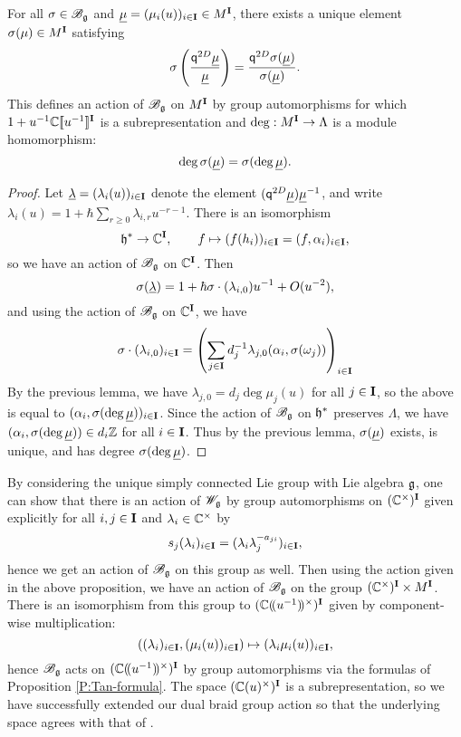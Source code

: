 \begin{proposition}\label{P:Bg-action-M}
    For all $\sigma\in\mathscr{B}_{\mathfrak{g}}$ and $\underline{\mu} = (\mu_i(u))_{i\in\mathbf{I}} \in M^{\mathbf{I}}$, there exists a unique element $\sigma(\mu)\in M^{\mathbf{I}}$ satisfying
    \[\sigma\left(\frac{\mathsf{q}^{2D}\underline{\mu}}{\underline{\mu}}\right) = \frac{\mathsf{q}^{2D}\sigma(\underline{\mu})}{\sigma(\underline{\mu})}.\]
    This defines an action of $\mathscr{B}_{\mathfrak{g}}$ on $M^{\mathbf{I}}$ by group automorphisms for which $1+u^{-1}\mathbb{C}[\![u^{-1}]\!]^{\mathbf{I}}$ is a subrepresentation and $\deg:M^{\mathbf{I}}\to\Lambda$ is a module homomorphism:
    \[\deg\sigma(\underline{\mu}) = \sigma(\deg\underline{\mu}).\]
\end{proposition}
\begin{proof}
    Let $\underline{\lambda} = (\lambda_i(u))_{i\in\mathbf{I}}$ denote the element $(\mathsf{q}^{2D}\underline{\mu})\underline{\mu}^{-1}$, and write $\lambda_i(u) = 1+\hbar\sum_{r\geq 0}\lambda_{i,r}u^{-r-1}$.
    There is an isomorphism
    \[\mathfrak{h}^*\to\mathbb{C}^{\mathbf{I}}, \qquad f\mapsto (f(h_i))_{i\in\mathbf{I}} = (f, \alpha_i)_{i\in\mathbf{I}},\]
    so we have an action of $\mathscr{B}_{\mathfrak{g}}$ on $\mathbb{C}^{\mathbf{I}}$.
    Then
    \[\sigma(\underline{\lambda}) = 1 + \hbar\sigma\cdot(\lambda_{i,0})u^{-1} + O(u^{-2}),\]
    and using the action of $\mathscr{B}_{\mathfrak{g}}$ on $\mathbb{C}^{\mathbf{I}}$, we have
    \[\sigma\cdot(\lambda_{i,0})_{i\in\mathbf{I}} = \left(\sum_{j\in\mathbf{I}}d_j^{-1}\lambda_{j,0}(\alpha_i,\sigma(\omega_j))\right)_{i\in\mathbf{I}}\]
    By the previous lemma, we have $\lambda_{j,0} = d_j\deg\mu_j(u)$ for all $j\in\mathbf{I}$, so the above is equal to $(\alpha_i,\sigma(\deg\underline{\mu}))_{i\in\mathbf{I}}$.
    Since the action of $\mathscr{B}_{\mathfrak{g}}$ on $\mathfrak{h}^*$ preserves $\Lambda$, we have $(\alpha_i,\sigma(\deg\underline{\mu}))\in d_i\mathbb{Z}$ for all $i\in\mathbf{I}$.
    Thus by the previous lemma, $\sigma(\underline{\mu})$ exists, is unique, and has degree $\sigma(\deg\underline{\mu})$.
\end{proof}

By considering the unique simply connected Lie group with Lie algebra $\mathfrak{g}$, one can show that there is an action of $\mathscr{W}_{\mathfrak{g}}$ by group automorphisms on $(\mathbb{C}^\times)^{\mathbf{I}}$ given explicitly for all $i,j\in\mathbf{I}$ and $\lambda_i\in\mathbb{C}^\times$ by
\[s_j(\lambda_i)_{i\in\mathbf{I}} = (\lambda_i\lambda_j^{-a_{ji}})_{i\in\mathbf{I}},\]
hence we get an action of $\mathscr{B}_{\mathfrak{g}}$ on this group as well.
Then using the action given in the above proposition, we have an action of $\mathscr{B}_{\mathfrak{g}}$ on the group $(\mathbb{C}^\times)^{\mathbf{I}}\times M^{\mathbf{I}}$.
There is an isomorphism from this group to $(\mathbb{C}(\!(u^{-1})\!)^\times)^{\mathbf{I}}$ given by component-wise multiplication:
\[((\lambda_i)_{i\in\mathbf{I}}, (\mu_i(u))_{i\in\mathbf{I}}) \mapsto (\lambda_i\mu_i(u))_{i\in\mathbf{I}},\]
hence $\mathscr{B}_{\mathfrak{g}}$ acts on $(\mathbb{C}(\!(u^{-1})\!)^\times)^{\mathbf{I}}$ by group automorphisms via the formulas of Proposition \ref{P:Tan-formula}.
The space $(\mathbb{C}(u)^\times)^{\mathbf{I}}$ is a subrepresentation, so we have successfully extended our dual braid group action so that the underlying space agrees with that of \cite[Prop. 3.1]{tan_braid_2015}.


